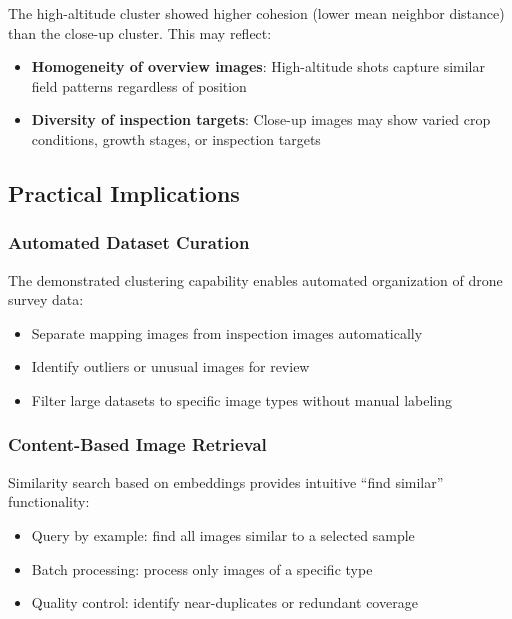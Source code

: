 The high-altitude cluster showed higher cohesion (lower mean neighbor distance) than the close-up cluster. This may reflect:

\begin{itemize}
    \item \textbf{Homogeneity of overview images}: High-altitude shots capture similar field patterns regardless of position
    \item \textbf{Diversity of inspection targets}: Close-up images may show varied crop conditions, growth stages, or inspection targets
\end{itemize}


\subsection{Practical Implications}

\subsubsection{Automated Dataset Curation}

The demonstrated clustering capability enables automated organization of drone survey data:

\begin{itemize}
    \item Separate mapping images from inspection images automatically
    \item Identify outliers or unusual images for review
    \item Filter large datasets to specific image types without manual labeling
\end{itemize}

\subsubsection{Content-Based Image Retrieval}

Similarity search based on embeddings provides intuitive ``find similar'' functionality:

\begin{itemize}
    \item Query by example: find all images similar to a selected sample
    \item Batch processing: process only images of a specific type
    \item Quality control: identify near-duplicates or redundant coverage
\end{itemize}

